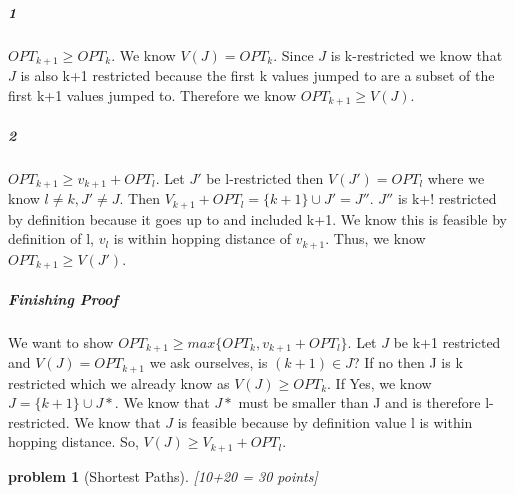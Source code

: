 \documentclass[10pt]{article}
\newtheorem{problem}{\sc\color{cit}problem}
\begin{document}
{\subparagraph{1} $OPT_{k+1} \geq OPT_k$. We know $V(J) = OPT_k$. Since $J$ is k-restricted we know that $J$ is also k+1 restricted because the first k values jumped to are a subset of the first
k+1 values jumped to. Therefore we know $OPT_{k+1} \geq V(J)$.

\subparagraph{2} $OPT_{k+1} \geq v_{k+1} + OPT_l$. Let $J'$ be l-restricted then $V(J') = OPT_l$ where we know $l \neq k, J' \neq J$. Then $V_{k+1} + OPT_l = \{k+1\} \cup J' = J''$. $J''$ is 
k+! restricted by definition because it goes up to and included k+1. We know this is feasible by definition of l, $v_l$ is within hopping distance of $v_{k+1}$. Thus, we know 
$OPT_{k+1} \geq V(J')$.

\subparagraph{Finishing Proof} We want to show $OPT_{k+1} \geq max\{OPT_k, v_{k+1} + OPT_l\}$. Let $J$ be k+1 restricted and $V(J) = OPT_{k+1}$ we ask ourselves, is $(k+1) \in J$? If no then J is k restricted which 
we already know as $V(J) \geq OPT_k$. If Yes, we know $J = \{k+1\} \cup J*$. We know that $J*$ must be smaller than J and is therefore l-restricted. We know that $J$ is feasible because by definition value l is within hopping distance. So, 
$V(J) \geq V_{k+1} + OPT_l$. 

}

\newpage
\medskip{}


\newpage
\begin{problem}[Shortest Paths][10+20 = 30 points]
\end{problem}
\end{document}
